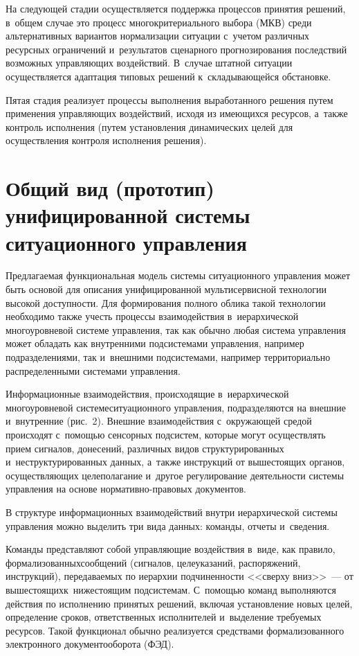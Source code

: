 \begin{multicols}{2}
    На следующей стадии осуществляется поддержка процессов принятия 
решений, в~общем случае это процесс многокритериального выбора (МКВ) среди 
альтернативных вариантов нормализации ситуации с~учетом различных 
ресурсных ограничений и~результатов сценарного прогнозирования 
по\-след\-ст\-вий возможных управ\-ля\-ющих воздействий. В~случае штатной 
ситуации осуществляется адап\-та\-ция типовых решений к~скла\-ды\-ва\-ющей\-ся 
обстановке.
    
    Пятая стадия реализует процессы выполнения выработанного решения 
путем применения управ\-ля\-ющих воздействий, исходя из име\-ющих\-ся 
ресурсов, а~также контроль исполнения (путем установления динамических 
целей для осуществления контроля исполнения решения).
    

\section{Общий вид (прототип) унифицированной  системы 
ситуационного управления}

    Предлагаемая функциональная модель системы ситуационного 
управления может быть основой для описания унифицированной 
мультисервисной технологии высокой доступности. Для формирования 
полного облика такой технологии необходимо также учесть процессы 
взаимодействия в~иерархической многоуровневой сис\-те\-ме управ\-ле\-ния, так 
как обычно любая сис\-те\-ма управ\-ле\-ния может обладать как внутренними 
под\-сис\-те\-ма\-ми управ\-ле\-ния, например подразделениями, так и~внешними 
под\-сис\-те\-ма\-ми, например территориально распределенными сис\-те\-ма\-ми 
управления.
    
     Информационные взаимодействия, происходящие в~иерархической 
многоуровневой системе\linebreak ситуационного управления, подразделяются на 
внешние и~внутренние (рис.~2). Внешние взаимодействия с~окружающей 
средой происходят с~по\-мощью сенсорных под\-сис\-тем, которые могут 
осуществлять прием сигналов, донесений, различных видов 
структурированных и~неструктурированных данных, а~также инструкций от 
вышестоящих органов, осу\-ще\-ст\-вля\-ющих целеполагание и~другое 
регулирование деятельности сис\-те\-мы управ\-ле\-ния на основе  
нор\-ма\-тив\-но-пра\-во\-вых документов.
    
    В структуре информационных взаимодействий внутри иерархической 
сис\-те\-мы управ\-ле\-ния можно выделить три вида данных: команды, отчеты 
и~сведения.
    
    Команды представляют собой управляющие воздействия в~виде, как 
правило, формализованных\linebreak сообщений (сигналов, целеуказаний, 
распоряжений, инструкций),  передаваемых по иерархии подчиненности 
<<сверху вниз>>~---  от вышестоящих\linebreak к~нижестоящим под\-сис\-те\-мам. 
С~по\-мощью команд\linebreak
 выполняются действия по исполнению  принятых 
решений, включая уста\-нов\-ле\-ние новых целей, определение сроков, 
ответственных исполнителей и~выделение требуемых ресурсов. Такой 
функционал обычно реа\-ли\-зу\-ет\-ся средствами формализованного 
электронного документооборота (ФЭД).



\end{multicols}
